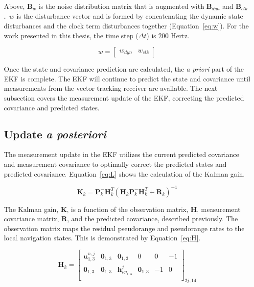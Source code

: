 Above, \(\mathbf{B}_w\) is the noise distribution matrix that is augmented with \(\mathbf{B}_{dyn}\) and \(\mathbf{B}_{clk}\).~\(w\) is the disturbance vector and is formed by concatenating the dynamic state disturbances and the clock term disturbances together (Equation~\ref{eq:w}). For the work presented in this thesis, the time step (\(\Delta t\)) is \(200\) Hertz.

\begin{equation}\label{eq:w}
    w = \begin{bmatrix}
        w_{dyn} & w_{clk}
    \end{bmatrix}
\end{equation}

Once the state and covariance prediction are calculated, the \textit{a priori} part of the EKF is complete. The EKF will continue to predict the state and covariance until measurements from the vector tracking receiver are available. The next subsection covers the measurement update of the EKF, correcting the predicted covariance and predicted states.

\subsection{\textbf{Update \textit{a posteriori}}}
The measurement update in the EKF utilizes the current predicted covariance and measurement covariance to optimally correct the predicted states and predicted covariance. Equation~\ref{eq:L} shows the calculation of the Kalman gain.

\begin{equation}\label{eq:L}
    \mathbf{K}_k = \mathbf{P}^-_k \mathbf{H}^T_k{\left(\mathbf{H}_k\mathbf{P}^-_k\mathbf{H}^T_k + \mathbf{R}_k\right)}^{-1}
\end{equation}

The Kalman gain, \(\mathbf{K}\), is a function of the observation matrix, \(\mathbf{H}\), measurement covariance matrix, \(\mathbf{R}\), and the predicted covariance, described previously. The observation matrix maps the residual pseudorange and pseudorange rates to the local navigation states. This is demonstrated by Equation~\ref{eq:H}.

\begin{equation}\label{eq:H}
    \mathbf{H}_k = \begin{bmatrix}
        \mathbf{u}^{n,j}_{1,3} & \mathbf{0}_{1,3} & \mathbf{0}_{1,3}            & 0                & 0  & -1 \\
        \mathbf{0}_{1,3}       & \mathbf{0}_{1,3} & \mathbf{h}^j_{\rho p_{1,3}} & \mathbf{0}_{1,3} & -1 & 0  \\
    \end{bmatrix}_{2j,14}
\end{equation}

